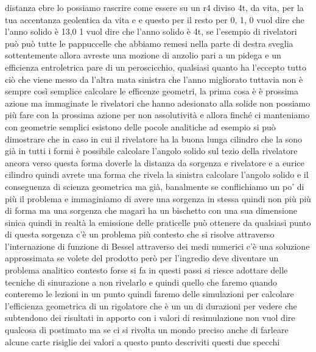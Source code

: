 distanza ebre lo possiamo rascrire come essere su un r4 diviso 4t, da vita, per la tua accentanza geolentica da vita e e questo per il resto per 0, 1, 0 vuol dire che l'anno solido è 13,0 1 vuol dire che l'anno solido è 4t, se l'esempio di rivelatori può può tutte le pappuccelle che abbiamo remesi nella parte di destra sveglia sottentemente allora avreste una mozione di anzolio pari a un pidega e un efficienza entroletrica pare di un peroscicchio, qualsiasi quanto ha l'eccepto tutto ciò che viene messo da l'altra mata sinistra che l'anno migliorato tuttavia non è sempre così semplice calcolare le efficenze geometri, la prima cosa è è prossima azione ma immaginate le rivelatori che hanno adesionato alla solide non possiamo più fare con la prossima azione per non assolutività e allora finché ci manteniamo con geometrie semplici esistono delle pocole analitiche ad esempio si può dimostrare che in caso in cui il rivelatore ha la buona lunga cilindro che la sono già in tutti i formi è possibile calcolare l'angolo solido sul tezio della rivelatore ancora verso questa forma doverle la distanza da sorgenza e rivelatore e a eurice cilindro quindi avrete una forma che rivela la sinistra calcolare l'angolo solido e il conseguenza di scienza geometrica ma già, banalmente se conflichiamo un po' di più il problema e immaginiamo di avere una sorgenza in stessa quindi non più più di forma ma una sorgenza che magari ha un bischetto con una sua dimensione sinica quindi in realtà la emissione delle praticelle può ottenere da qualsiasi punto di questa sorgenza c'è un problema più contesto che si risolve attraverso l'internazione di funzione di Bessel attraverso dei medi numerici c'è una soluzione approssimata se volete del prodotto però per l'ingredio deve diventare un problema analitico contesto forse si fa in questi passi si riesce adottare delle tecniche di sinurazione a non rivelarlo e quindi quello che faremo quando conteremo le lezioni in un punto quindi faremo delle simulazioni per calcolare l'efficienza geometrica di un rigolatore che è un un di durazioni per vedere che subtendono dei risultati in apporto con i valori di resimulazione non vuol dire qualcosa di postimato ma se ci si rivolta un mondo preciso anche di farleare alcune carte risiglie dei valori a questo punto descriviti questi due specchi 

